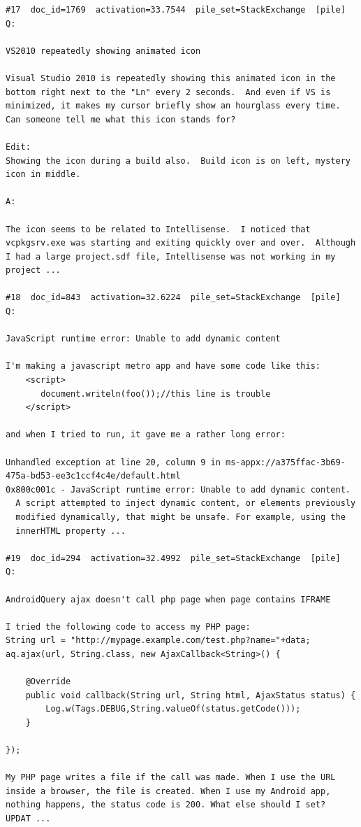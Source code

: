 \begin{verbatim}
#17  doc_id=1769  activation=33.7544  pile_set=StackExchange  [pile]
Q:

VS2010 repeatedly showing animated icon

Visual Studio 2010 is repeatedly showing this animated icon in the bottom right next to the "Ln" every 2 seconds.  And even if VS is minimized, it makes my cursor briefly show an hourglass every time.  Can someone tell me what this icon stands for? 

Edit:
Showing the icon during a build also.  Build icon is on left, mystery icon in middle.

A:

The icon seems to be related to Intellisense.  I noticed that vcpkgsrv.exe was starting and exiting quickly over and over.  Although I had a large project.sdf file, Intellisense was not working in my project ...

#18  doc_id=843  activation=32.6224  pile_set=StackExchange  [pile]
Q:

JavaScript runtime error: Unable to add dynamic content

I'm making a javascript metro app and have some code like this:
    <script>
       document.writeln(foo());//this line is trouble
    </script>

and when I tried to run, it gave me a rather long error:

Unhandled exception at line 20, column 9 in ms-appx://a375ffac-3b69-475a-bd53-ee3c1ccf4c4e/default.html
0x800c001c - JavaScript runtime error: Unable to add dynamic content.
  A script attempted to inject dynamic content, or elements previously
  modified dynamically, that might be unsafe. For example, using the
  innerHTML property ...

#19  doc_id=294  activation=32.4992  pile_set=StackExchange  [pile]
Q:

AndroidQuery ajax doesn't call php page when page contains IFRAME

I tried the following code to access my PHP page:
String url = "http://mypage.example.com/test.php?name="+data;
aq.ajax(url, String.class, new AjaxCallback<String>() {

    @Override
    public void callback(String url, String html, AjaxStatus status) {
        Log.w(Tags.DEBUG,String.valueOf(status.getCode()));
    }

});

My PHP page writes a file if the call was made. When I use the URL inside a browser, the file is created. When I use my Android app, nothing happens, the status code is 200. What else should I set?
UPDAT ...


\end{verbatim}
